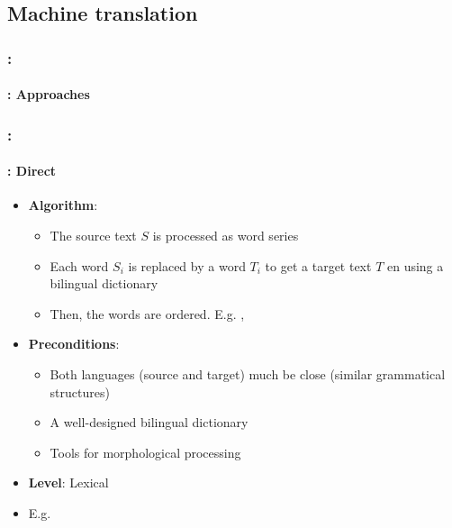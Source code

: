 \documentclass[xcolor=table]{beamer}
\begin{document}
\subsection{Machine translation}

\begin{frame}
	\frametitle{\insertshortsubtitle: \insertsection}
	\framesubtitle{\insertsubsection: Approaches}
	
	
\end{frame}

\begin{frame}
	\frametitle{\insertshortsubtitle: \insertsection}
	\framesubtitle{\insertsubsection: Direct}
	
	\begin{itemize}
		\item \textbf{Algorithm}:
		\begin{itemize}
			\item The source text $S$ is processed as word series
			\item Each word $S_i$ is replaced by a word $T_i$ to get a target text $T$ en using a bilingual dictionary			
			\item Then, the words are ordered. E.g. , 
		\end{itemize}
		\item \textbf{Preconditions}:
		\begin{itemize}
			\item Both languages (source and target) much be close (similar grammatical structures)
			\item A well-designed bilingual dictionary
			\item Tools for morphological processing
		\end{itemize}
		\item \textbf{Level}: Lexical 
		\item E.g. 
	\end{itemize}

\end{frame}
\end{document}
